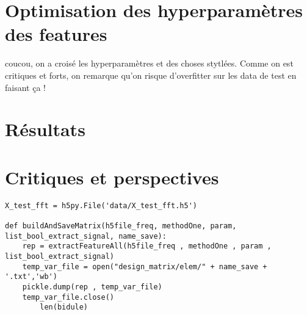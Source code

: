 \documentclass{article}
\begin{document}
\section{Optimisation des hyperparamètres des features}
coucou, on a croisé les hyperparamètres et des choses stytlées.
Comme on est critiques et forts, on remarque qu'on risque d'overfitter sur les data de test en faisant ça !

\section{Résultats}

\section{ Critiques et perspectives}

\begin{lstlisting}
X_test_fft = h5py.File('data/X_test_fft.h5')

def buildAndSaveMatrix(h5file_freq, methodOne, param, list_bool_extract_signal, name_save):
    rep = extractFeatureAll(h5file_freq , methodOne , param , list_bool_extract_signal)
    temp_var_file = open("design_matrix/elem/" + name_save + '.txt','wb')
    pickle.dump(rep , temp_var_file)
    temp_var_file.close()
		len(bidule)
\end{lstlisting}
\end{document}
